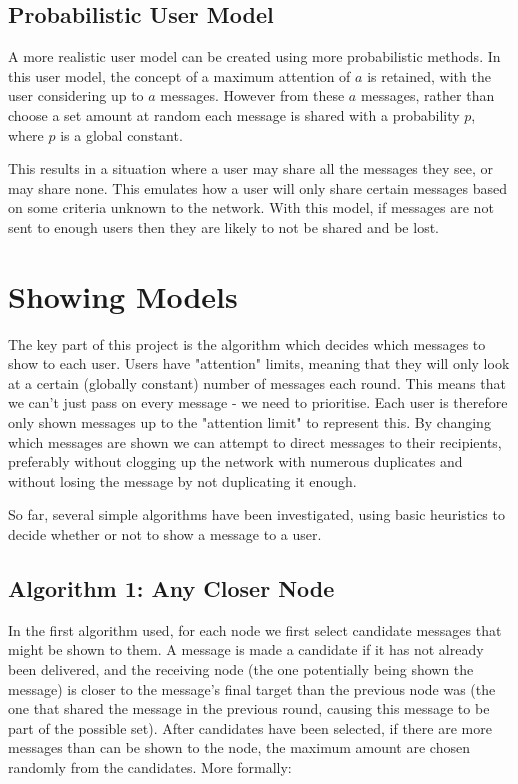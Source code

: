 \documentclass[bsc,frontabs,twoside,singlespacing,parskip,deptreport]{infthesis}     %
\begin{document}
\subsection{Probabilistic User Model}
A more realistic user model can be created using more probabilistic methods. In this user model, the concept of a maximum attention of $a$ is retained, with the user considering up to $a$ messages. However from these $a$ messages, rather than choose a set amount at random each message is shared with a probability $p$, where $p$ is a global constant.

This results in a situation where a user may share all the messages they see, or may share none. This emulates how a user will only share certain messages based on some criteria unknown to the network. With this model, if messages are not sent to enough users then they are likely to not be shared and be lost.

\section{Showing Models}
The key part of this project is the algorithm which decides which messages to show to each user. Users have "attention" limits, meaning that they will only look at a certain (globally constant) number of messages each round. This means that we can't just pass on every message - we need to prioritise. Each user is therefore only shown messages up to the "attention limit" to represent this. By changing which messages are shown we can attempt to direct messages to their recipients, preferably without clogging up the network with numerous duplicates and without losing the message by not duplicating it enough.

So far, several simple algorithms have been investigated, using basic heuristics to decide whether or not to show a message to a user.

\subsection{Algorithm 1: Any Closer Node}
In the first algorithm used, for each node we first select candidate messages that might be shown to them. A message is made a candidate if it has not already been delivered, and the receiving node (the one potentially being shown the message) is closer to the message's final target than the previous node was (the one that shared the message in the previous round, causing this message to be part of the possible set). After candidates have been selected, if there are more messages than can be shown to the node, the maximum amount are chosen randomly from the candidates. More formally:
\end{document}
